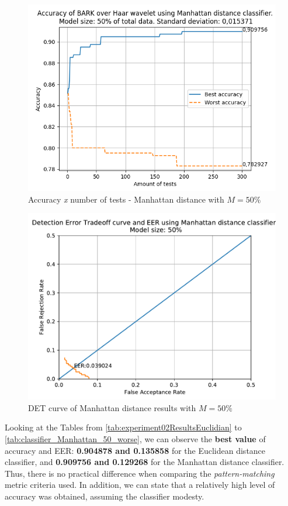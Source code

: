 \begin{figure}[H]
\centering
\includegraphics[scale=.6]{images/results/confusionMatrices/classifier_Manhattan_50.png}
\caption{Accuracy \textit{x} number of tests - Manhattan distance with $M=50\%$}
\label{fig:classifiermanhattan50}
\end{figure}
\begin{figure}[H]
\centering
\includegraphics[scale=.6]{images/results/det/DET_for_classifier_Manhattan_50}
\caption{DET curve of Manhattan distance results with $M=50\%$}
\label{fig:detforclassifiermanhattan50}
\end{figure}
\par Looking at the Tables from \ref{tab:experiment02ResultsEuclidian} to \ref{tab:classifier_Manhattan_50_worse}, we can observe the \textbf{best value} of accuracy and EER: \textbf{0.904878 and 0.135858} for the Euclidean distance classifier, and \textbf{0.909756 and 0.129268} for the Manhattan distance classifier. Thus, there is no practical difference when comparing the \textit{pattern-matching} metric criteria used. In addition, we can state that a relatively high level of accuracy was obtained, assuming the classifier modesty.

